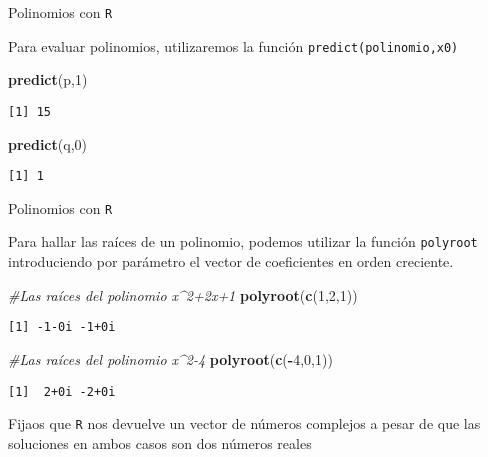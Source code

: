 \documentclass[
  ignorenonframetext,
]{beamer}
\newenvironment{Shaded}{\begin{snugshade}}{\end{snugshade}}
\newcommand{\CommentTok}[1]{\textcolor[rgb]{0.56,0.35,0.01}{\textit{#1}}}
\newcommand{\DecValTok}[1]{\textcolor[rgb]{0.00,0.00,0.81}{#1}}
\newcommand{\KeywordTok}[1]{\textcolor[rgb]{0.13,0.29,0.53}{\textbf{#1}}}
\newcommand{\NormalTok}[1]{#1}
\newcommand{\OperatorTok}[1]{\textcolor[rgb]{0.81,0.36,0.00}{\textbf{#1}}}
\begin{document}
\begin{frame}[fragile]{Polinomios con \texttt{R}}
\protect\hypertarget{polinomios-con-r-6}{}

Para evaluar polinomios, utilizaremos la función
\texttt{predict(polinomio,x0)}

\begin{Shaded}
\begin{Highlighting}[]
\KeywordTok{predict}\NormalTok{(p,}\DecValTok{1}\NormalTok{)}
\end{Highlighting}
\end{Shaded}

\begin{verbatim}
[1] 15
\end{verbatim}

\begin{Shaded}
\begin{Highlighting}[]
\KeywordTok{predict}\NormalTok{(q,}\DecValTok{0}\NormalTok{)}
\end{Highlighting}
\end{Shaded}

\begin{verbatim}
[1] 1
\end{verbatim}

\end{frame}

\begin{frame}[fragile]{Polinomios con \texttt{R}}
\protect\hypertarget{polinomios-con-r-7}{}

Para hallar las raíces de un polinomio, podemos utilizar la función
\texttt{polyroot} introduciendo por parámetro el vector de coeficientes
en orden creciente.

\begin{Shaded}
\begin{Highlighting}[]
\CommentTok{#Las raíces del polinomio x^2+2x+1}
\KeywordTok{polyroot}\NormalTok{(}\KeywordTok{c}\NormalTok{(}\DecValTok{1}\NormalTok{,}\DecValTok{2}\NormalTok{,}\DecValTok{1}\NormalTok{))}
\end{Highlighting}
\end{Shaded}

\begin{verbatim}
[1] -1-0i -1+0i
\end{verbatim}

\begin{Shaded}
\begin{Highlighting}[]
\CommentTok{#Las raíces del polinomio x^2-4}
\KeywordTok{polyroot}\NormalTok{(}\KeywordTok{c}\NormalTok{(}\OperatorTok{-}\DecValTok{4}\NormalTok{,}\DecValTok{0}\NormalTok{,}\DecValTok{1}\NormalTok{))}
\end{Highlighting}
\end{Shaded}

\begin{verbatim}
[1]  2+0i -2+0i
\end{verbatim}

Fijaos que \texttt{R} nos devuelve un vector de números complejos a
pesar de que las soluciones en ambos casos son dos números reales

\end{frame}
\end{document}
